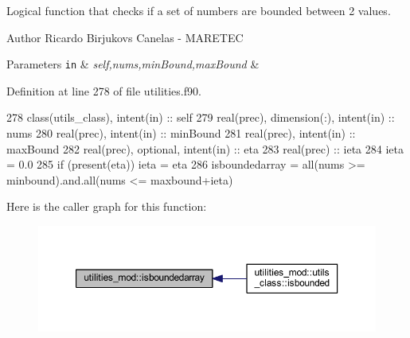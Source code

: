 Logical function that checks if a set of numbers are bounded between 2 values. 

\begin{DoxyAuthor}{Author}
Ricardo Birjukovs Canelas -\/ M\+A\+R\+E\+T\+EC 
\end{DoxyAuthor}

\begin{DoxyParams}[1]{Parameters}
\mbox{\tt in}  & {\em self,nums,min\+Bound,max\+Bound} & \\
\hline
\end{DoxyParams}


Definition at line 278 of file utilities.\+f90.


\begin{DoxyCode}
278     \textcolor{keywordtype}{class}(utils\_class), \textcolor{keywordtype}{intent(in)} :: self
279     \textcolor{keywordtype}{real(prec)}, \textcolor{keywordtype}{dimension(:)}, \textcolor{keywordtype}{intent(in)} :: nums
280     \textcolor{keywordtype}{real(prec)}, \textcolor{keywordtype}{intent(in)} :: minBound
281     \textcolor{keywordtype}{real(prec)}, \textcolor{keywordtype}{intent(in)} :: maxBound
282     \textcolor{keywordtype}{real(prec)}, \textcolor{keywordtype}{optional}, \textcolor{keywordtype}{intent(in)} :: eta
283     \textcolor{keywordtype}{real(prec)} :: ieta
284     ieta = 0.0
285     \textcolor{keywordflow}{if} (\textcolor{keyword}{present}(eta)) ieta = eta
286     isboundedarray = all(nums >= minbound).and.all(nums <= maxbound+ieta)
\end{DoxyCode}
Here is the caller graph for this function\+:\nopagebreak
\begin{figure}[H]
\begin{center}
\leavevmode
\includegraphics[width=350pt]{namespaceutilities__mod_a1d16eada2f4cb344ad1500b3edba43fa_icgraph}
\end{center}
\end{figure}
\mbox{\label{namespaceutilities__mod_a258d85bcc477041275bd954667168ea3}} 
